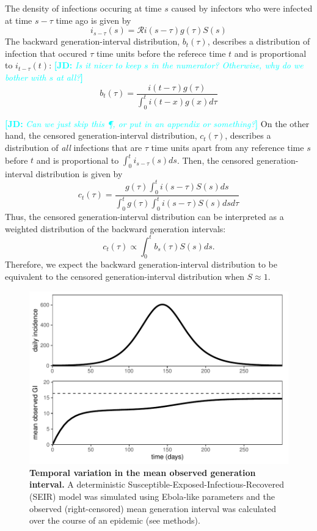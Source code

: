 \documentclass[12pt]{article}
\newcommand{\RR}{\ensuremath{{\mathcal R}}}
\newcommand{\comment}[3]{\textcolor{#1}{\textbf{[#2: }\textsl{#3}\textbf{]}}}
\newcommand{\jd}[1]{\comment{cyan}{JD}{#1}}
\begin{document}
The density of infections occuring at time $s$ caused by infectors who were infected at time $s-\tau$ time ago is given by
\begin{equation}
i_{s-\tau}(s) = \RR i(s-\tau) g(\tau) S(s)
\end{equation}
The backward generation-interval distribution, $b_t(\tau)$, describes a distribution of infection that occured $\tau$ time units before the referece time $t$ and is proportional to $i_{t-\tau}(t)$:
\jd{Is it nicer to keep $s$ in the numerator? Otherwise, why do we bother with $s$ at all?}
\begin{equation}
b_t(\tau) = \frac{i(t-\tau) g(\tau)}{\int_0^t i(t-x) g(x) d\tau}
\end{equation}

\jd{Can we just skip this \P, or put in an appendix or something?}
On the other hand, the censored generation-interval distribution, $c_t(\tau)$, describes a distribution of \emph{all} infections that are $\tau$ time units apart from any reference time $s$ before $t$ and is proportional to $\int_0^t i_{s-\tau}(s) ds$.
Then, the censored generation-interval distribution is given by
\begin{equation}\label{eq:obsg}
c_t(\tau) = \frac{g(\tau) \int_0^t i(s-\tau) S(s) ds}{\int_0^t g(\tau) \int_0^t i(s-\tau) S(s) ds d\tau}
\end{equation}
Thus, the censored generation-interval distribution can be interpreted as a weighted distribution of the backward generation intervals:
\begin{equation}
c_t(\tau) \propto \int_0^t b_s(\tau) S(s) ds.
\end{equation}
Therefore, we expect the backward generation-interval distribution to be equivalent to the censored generation-interval distribution when $S \approx 1$.

\begin{figure}[t]
\includegraphics[width=\textwidth]{../fig/temporal_effect.pdf}
\caption{\textbf{Temporal variation in the mean observed generation interval.}
A deterministic Susceptible-Exposed-Infectious-Recovered (SEIR) model was simulated using Ebola-like parameters and the observed (right-censored) mean generation interval was calculated over the course of an epidemic (see methods).
}
\label{fig:censor}
\end{figure}
\end{document}

